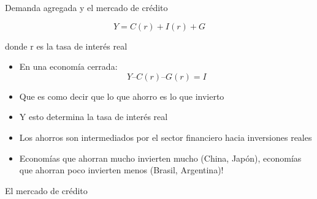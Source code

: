 \documentclass{beamer}
\begin{document}
\begin{frame}{Demanda agregada y el mercado de crédito}

$$ Y = C(r) + I(r) + G $$

\centering \small{donde r es la tasa de interés real}

\begin{itemize}
\item En una economía cerrada:
$$ Y – C(r) – G(r) = I $$
\end{itemize}
\begin{itemize}
\item Que es como decir que lo que ahorro es lo que invierto
\item Y esto determina la tasa de interés real
\item Los ahorros son intermediados por el sector financiero hacia inversiones reales
\item Economías que ahorran mucho invierten mucho (China, Japón), economías que ahorran poco invierten menos (Brasil, Argentina)! 
\end{itemize}
\end{frame}


\begin{frame}{El mercado de crédito}
\begin{center}
\begin{figure}[H]
\renewcommand{\figurename}{Figure}
\begin{center}
\end{center}
\end{figure}
\end{center}  
\end{frame}
\end{document}
